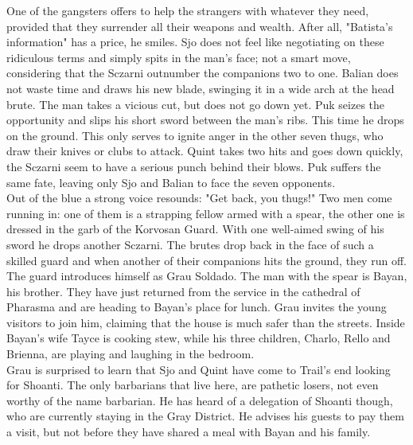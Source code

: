 One of the gangsters offers to help the strangers with whatever they need, provided that they surrender all their weapons and wealth. After all, "Batista's information" has a price, he smiles. Sjo does not feel like negotiating on these ridiculous terms and simply spits in the man's face; not a smart move, considering that the Sczarni outnumber the companions two to one. Balian does not waste time and draws his new blade, swinging it in a wide arch at the head brute. The man takes a vicious cut, but does not go down yet. Puk seizes the opportunity and slips his short sword between the man's ribs. This time he drops on the ground. This only serves to ignite anger in the other seven thugs, who draw their knives or clubs to attack. Quint takes two hits and goes down quickly, the Sczarni seem to have a serious punch behind their blows. Puk suffers the same fate, leaving only Sjo and Balian to face the seven opponents.\\

Out of the blue a strong voice resounds: "Get back, you thugs!" Two men come running in: one of them is a strapping fellow armed with a spear, the other one is dressed in the garb of the Korvosan Guard. With one well-aimed swing of his sword he drops another Sczarni. The brutes drop back in the face of such a skilled guard and when another of their companions hits the ground, they run off.\\

The guard introduces himself as Grau Soldado. The man with the spear is Bayan, his brother. They have just returned from the service in the cathedral of Pharasma and are heading to Bayan's place for lunch. Grau invites the young visitors to join him, claiming that the house is much safer than the streets. Inside Bayan's wife Tayce is cooking stew, while his three children, Charlo, Rello and Brienna, are playing and laughing in the bedroom.\\

Grau is surprised to learn that Sjo and Quint have come to Trail's end looking for Shoanti. The only barbarians that live here, are pathetic losers, not even worthy of the name barbarian. He has heard of a delegation of Shoanti though, who are currently staying in the Gray District. He advises his guests to pay them a visit, but not before they have shared a meal with Bayan and his family.\\

